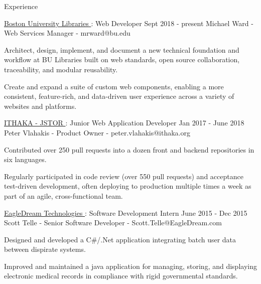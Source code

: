 \documentclass{resume} %
\begin{document}
  \begin{rSection}{Experience}

    \begin{rSubsection}{\underline{Boston University Libraries }: Web Developer }{ Sept 2018 - present }{ Michael Ward - Web Services Manager - mrward@bu.edu }

      \item Architect, design, implement, and document a new technical foundation and workflow at BU Libraries built on web standards, open source collaboration, traceability, and modular reusability.

      \item Create and expand a suite of custom web components, enabling a more consistent, feature-rich, and data-driven user experience across a variety of websites and platforms.

    \end{rSubsection}

    \begin{rSubsection}{\underline{ITHAKA - JSTOR }: Junior Web Application Developer }{ Jan 2017 - June 2018 }{ Peter Vlahakis - Product Owner - peter.vlahakis@ithaka.org }

      \item Contributed over 250 pull requests into a dozen front and backend repositories in six languages.

      \item Regularly participated in code review (over 550 pull requests) and acceptance test-driven development, often deploying to production multiple times a week as part of an agile, cross-functional team.

    \end{rSubsection}

    \begin{rSubsection}{\underline{EagleDream Technologies }: Software Development Intern }{ June 2015 - Dec 2015 }{ Scott Telle - Senior Software Developer - Scott.Telle@EagleDream.com }

      \item Designed and developed a C\#/.Net application integrating batch user data between dispirate systems.

      \item Improved and maintained a java application for managing, storing, and displaying electronic medical records in compliance with rigid governmental standards.

    \end{rSubsection}

  \end{rSection}
\end{document}

